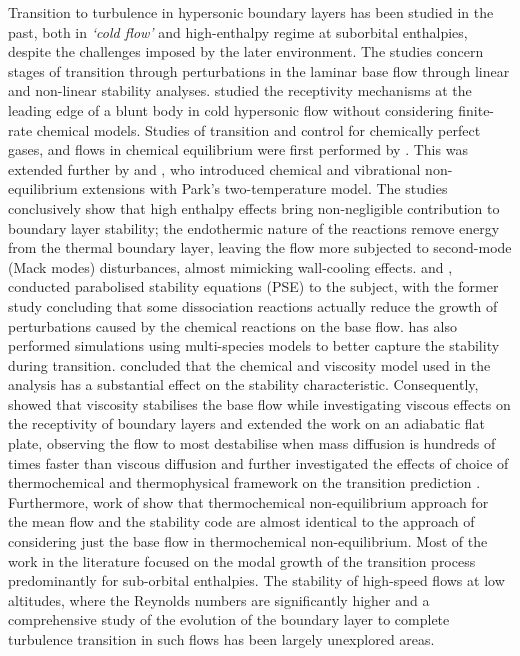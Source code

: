 Transition to turbulence in hypersonic boundary layers has been studied in the past, both in \textit{`cold flow'} and high-enthalpy regime at suborbital enthalpies, despite the challenges imposed by the later environment. The studies concern stages of transition through perturbations in the laminar base flow through linear and non-linear stability analyses. \cite{Cerminara2019, cerminarasandham2020} studied the receptivity mechanisms at the leading edge of a blunt body in cold hypersonic flow without considering finite-rate chemical models. Studies of transition and control for chemically perfect gases, and flows in chemical equilibrium were first performed by  \citep{Malik1989, Malik1990b, Malik1990a, Malik1990c}. This was extended further by \cite{Stuckert1994} and \cite{Hudson1997}, who introduced chemical and vibrational non-equilibrium extensions with Park's two-temperature model. The studies conclusively show that high enthalpy effects bring non-negligible contribution to boundary layer stability; the endothermic nature of the reactions remove energy from the thermal boundary layer, leaving the flow more subjected to second-mode (Mack modes) disturbances, almost mimicking wall-cooling effects. \cite{Malik2003} and \cite{Johnson2005}, conducted parabolised stability equations (PSE) to the subject, with the former study concluding that some dissociation reactions actually reduce the growth of perturbations caused by the chemical reactions on the base flow. \cite{Johnson2005} has also performed simulations using multi-species models to better capture the stability during transition. \cite{Franko2010} concluded that the chemical and viscosity model used in the analysis has a substantial effect on the stability characteristic. Consequently, \cite{Klentzman2013} showed that viscosity stabilises the base flow while investigating viscous effects on the receptivity of boundary layers and \cite{miromiro2018} extended the work on an adiabatic flat plate, observing the flow to most destabilise when mass diffusion is hundreds of times faster than viscous diffusion and further investigated the effects of choice of thermochemical and thermophysical framework on the transition prediction \citep{miromiro2019}. Furthermore, work of \cite{wartmann2018} show that thermochemical non-equilibrium approach for the mean flow and the stability code are almost identical to the approach of considering just the base flow in thermochemical non-equilibrium. Most of the work in the literature focused on the modal growth of the transition process predominantly for sub-orbital enthalpies. The stability of high-speed flows at low altitudes, where the Reynolds numbers are significantly higher and a comprehensive study of the evolution of the boundary layer to complete turbulence transition in such flows has been largely unexplored areas.  

